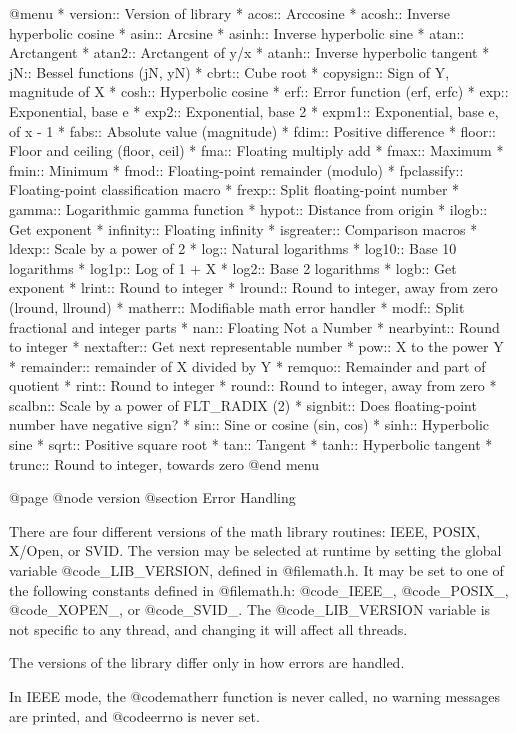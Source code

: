 @menu
* version::	Version of library
* acos::	Arccosine
* acosh::	Inverse hyperbolic cosine
* asin::	Arcsine
* asinh::	Inverse hyperbolic sine
* atan::	Arctangent
* atan2::	Arctangent of y/x
* atanh::	Inverse hyperbolic tangent
* jN::	        Bessel functions (jN, yN)
* cbrt::	Cube root
* copysign::	Sign of Y, magnitude of X
* cosh::	Hyperbolic cosine
* erf::		Error function (erf, erfc)
* exp::		Exponential, base e
* exp2::	Exponential, base 2
* expm1::	Exponential, base e, of x - 1
* fabs::	Absolute value (magnitude)
* fdim::	Positive difference
* floor::	Floor and ceiling (floor, ceil)
* fma::		Floating multiply add
* fmax::	Maximum
* fmin::	Minimum
* fmod::	Floating-point remainder (modulo)
* fpclassify::	Floating-point classification macro
* frexp::	Split floating-point number
* gamma::	Logarithmic gamma function
* hypot::	Distance from origin
* ilogb::	Get exponent
* infinity::	Floating infinity
* isgreater::	Comparison macros
* ldexp::	Scale by a power of 2
* log::		Natural logarithms
* log10::	Base 10 logarithms
* log1p::	Log of 1 + X
* log2::	Base 2 logarithms
* logb::	Get exponent
* lrint::	Round to integer
* lround::	Round to integer, away from zero (lround, llround)
* matherr::	Modifiable math error handler
* modf::	Split fractional and integer parts
* nan::		Floating Not a Number
* nearbyint::	Round to integer
* nextafter::	Get next representable number
* pow::		X to the power Y
* remainder::	remainder of X divided by Y
* remquo::	Remainder and part of quotient
* rint::	Round to integer
* round::	Round to integer, away from zero
* scalbn::	Scale by a power of FLT_RADIX (2)
* signbit::	Does floating-point number have negative sign?
* sin::		Sine or cosine (sin, cos)
* sinh::	Hyperbolic sine
* sqrt::	Positive square root
* tan::		Tangent
* tanh::	Hyperbolic tangent
* trunc::	Round to integer, towards zero
@end menu

@page
@node version
@section Error Handling

There are four different versions of the math library routines: IEEE,
POSIX, X/Open, or SVID.  The version may be selected at runtime by
setting the global variable @code{_LIB_VERSION}, defined in
@file{math.h}.  It may be set to one of the following constants defined
in @file{math.h}: @code{_IEEE_}, @code{_POSIX_}, @code{_XOPEN_}, or
@code{_SVID_}.  The @code{_LIB_VERSION} variable is not specific to any
thread, and changing it will affect all threads.

The versions of the library differ only in how errors are handled.

In IEEE mode, the @code{matherr} function is never called, no warning
messages are printed, and @code{errno} is never set.

